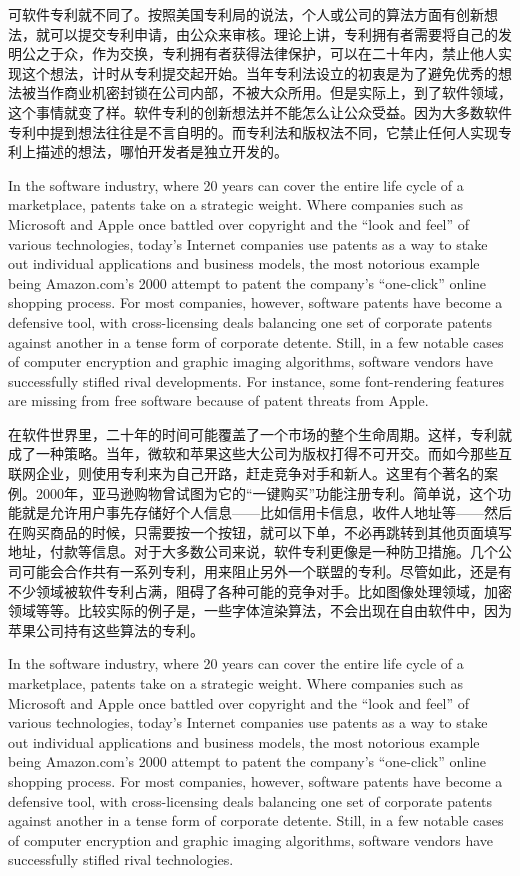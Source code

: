 \ifdefined\chs
可软件专利就不同了。按照美国专利局的说法，个人或公司的算法方面有创新想法，就可以提交专利申请，由公众来审核。理论上讲，专利拥有者需要将自己的发明公之于众，作为交换，专利拥有者获得法律保护，可以在二十年内，禁止他人实现这个想法，计时从专利提交起开始。当年专利法设立的初衷是为了避免优秀的想法被当作商业机密封锁在公司内部，不被大众所用。但是实际上，到了软件领域，这个事情就变了样。软件专利的创新想法并不能怎么让公众受益。因为大多数软件专利中提到想法往往是不言自明的。而专利法和版权法不同，它禁止任何人实现专利上描述的想法，哪怕开发者是独立开发的。
\fi
\fi


\ifdefined\vtwo
\ifdefined\eng
In the software industry, where 20 years can cover the entire life cycle of a marketplace, patents take on a strategic weight. Where companies such as Microsoft and Apple once battled over copyright and the ``look and feel'' of various technologies, today's Internet companies use patents as a way to stake out individual applications and business models, the most notorious example being Amazon.com's 2000 attempt to patent the company's ``one-click'' online shopping process. For most companies, however, software patents have become a defensive tool, with cross-licensing deals balancing one set of corporate patents against another in a tense form of corporate detente. Still, in a few notable cases of computer encryption and graphic imaging algorithms, software vendors have successfully stifled rival developments.  For instance, some font-rendering features are missing from free software because of patent threats from Apple.
\fi

\ifdefined\chs
在软件世界里，二十年的时间可能覆盖了一个市场的整个生命周期。这样，专利就成了一种策略。当年，微软和苹果这些大公司为版权打得不可开交。而如今那些互联网企业，则使用专利来为自己开路，赶走竞争对手和新人。这里有个著名的案例。2000年，亚马逊购物曾试图为它的``一键购买''功能注册专利。简单说，这个功能就是允许用户事先存储好个人信息——比如信用卡信息，收件人地址等——然后在购买商品的时候，只需要按一个按钮，就可以下单，不必再跳转到其他页面填写地址，付款等信息。对于大多数公司来说，软件专利更像是一种防卫措施。几个公司可能会合作共有一系列专利，用来阻止另外一个联盟的专利。尽管如此，还是有不少领域被软件专利占满，阻碍了各种可能的竞争对手。比如图像处理领域，加密领域等等。比较实际的例子是，一些字体渲染算法，不会出现在自由软件中，因为苹果公司持有这些算法的专利。
\fi
\fi

\ifdefined\vone
\ifdefined\eng
In the software industry, where 20 years can cover the entire life cycle of a marketplace, patents take on a strategic weight. Where companies such as Microsoft and Apple once battled over copyright and the ``look and feel'' of various technologies, today's Internet companies use patents as a way to stake out individual applications and business models, the most notorious example being Amazon.com's 2000 attempt to patent the company's ``one-click'' online shopping process. For most companies, however, software patents have become a defensive tool, with cross-licensing deals balancing one set of corporate patents against another in a tense form of corporate detente. Still, in a few notable cases of computer encryption and graphic imaging algorithms, software vendors have successfully stifled rival technologies.
\fi

